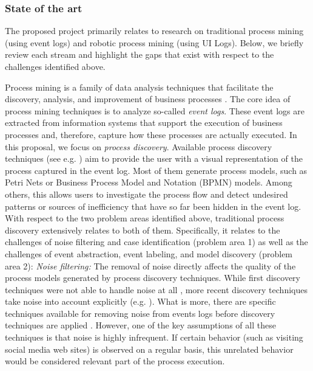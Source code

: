  
\subsubsection{State of the art} 
 \label{sec:stateoftheart}
 
The proposed project primarily relates to research on traditional process mining (using event logs) and robotic process mining (using UI Logs). Below, we briefly review each stream and highlight the gaps that exist with respect to the challenges identified above.  

 Process mining is a family of data analysis techniques that facilitate the discovery, analysis, and improvement of business processes \cite{van2016data}. The core idea of process mining techniques is to analyze so-called \textit{event logs}. These event logs are extracted from information systems that support the execution of business processes and, therefore, capture how these processes are actually executed. In this proposal, we focus on \textit{process discovery}. Available process discovery techniques (see e.g. \cite{gunther2007fuzzy,weijters2011flexible,leemans2013discovering}) aim to provide the user with a visual representation of the process captured in the event log. Most of them generate process models, such as Petri Nets or Business Process Model and Notation (BPMN) models. Among others, this allows users to investigate the process flow and detect undesired patterns or sources of inefficiency that have so far been hidden in the event log. With respect to the two problem areas identified above, traditional process discovery extensively relates to both of them. Specifically, it relates to the challenges of noise filtering and case identification (problem area 1) as well as the challenges of event abstraction, event labeling, and model discovery (problem area 2):
\vspace{0.2em}
\newline%
\noindent \textit{Noise filtering:} The removal of noise directly affects the quality of the process models generated by process discovery techniques. While first discovery techniques were not able to handle noise at all \cite{van2004workflow}, more recent discovery techniques take noise into account explicitly (e.g. \cite{weijters2003rediscovering,leemans2013discovering,van2016avoiding}). What is more, there are specific techniques available for removing noise from events logs before discovery techniques are applied \cite{tax2017discovering,CHENG2015138}. However, one of the key assumptions of all these techniques is that noise is highly infrequent. If certain behavior (such as visiting social media web sites) is observed on a regular basis, this unrelated behavior would be considered relevant part of the process execution. 
